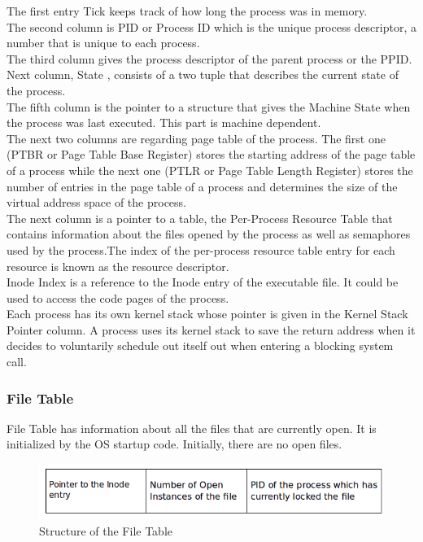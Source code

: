 \documentclass[10pt]{article}
\begin{document}
The first entry Tick keeps track of how long the process was in memory. \\
The second column is PID or Process ID which is the unique process descriptor, a number that is unique to each process.\\ 
The third column gives the process descriptor of the parent process or the PPID.\\
Next column, State , consists of a two tuple that describes the current state of the process.\\
The fifth column is the pointer to a structure that gives the Machine State when the process was last executed.  This part is machine dependent. \\
The next two columns are regarding page table of the process. The first one (PTBR or Page Table Base Register) stores the starting address of the page table of a process while the next one (PTLR or Page Table Length Register) stores the number of entries in the page table of a process and determines the size of the virtual address space of the process.\\
The next column is a pointer to a table, the Per-Process Resource Table that contains information about the files opened by the process as well as semaphores used by the process.The index of the per-process resource table entry for each resource is known as the resource descriptor.\\
Inode Index is a reference to the Inode entry of the executable file. It could be used to access the code pages of the process.\\
Each process has its own kernel stack whose pointer is given in the Kernel Stack Pointer column. A process uses its kernel stack to save the return address when it decides to voluntarily schedule out itself out when entering a blocking system call. 
\subsubsection{File Table}
File Table has information about all the files that are currently open.  It is initialized by the OS startup code.  Initially, there are no open files.
\begin{figure}[ht]
\centering
\includegraphics[scale=0.50]{File_table.png}
\caption{\footnotesize Structure of the File Table}
\label{fig_1}
\end{figure}
\end{document}
